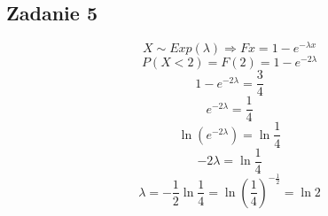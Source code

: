 \subsection{Zadanie 5}

$$X \sim Exp(\lambda) \Rightarrow Fx=1-e^{-\lambda x}$$
$$P(X<2)=F(2)=1-e^{-2\lambda}$$
$$1-e^{-2\lambda}=\frac{3}{4}$$
$$e^{-2\lambda}=\frac{1}{4}$$
$$\ln(e^{-2\lambda})=\ln\frac{1}{4}$$
$$-2\lambda=\ln\frac{1}{4}$$
$$\lambda=-\frac{1}{2}\ln\frac{1}{4}=\ln(\frac{1}{4})^{-\frac{1}{2}}=\ln2$$
